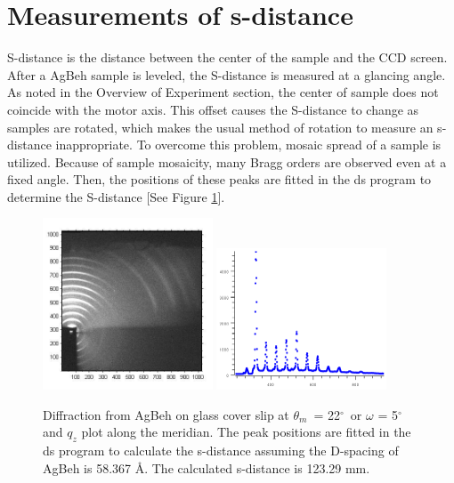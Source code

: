 \documentclass[letterpaper,12pt]{article}
\newcommand{\dg}{$^{\circ}$}%
\newcommand{\motor}{$\theta_m$}%
\begin{document}
\newpage
\section{Measurements of s-distance}
S-distance is the distance between the center of the sample and the CCD screen. After a AgBeh sample is leveled, the S-distance is measured at a glancing angle. As noted in the Overview of Experiment section, the center of sample does not coincide with the motor axis. This offset causes the S-distance to change as samples are rotated, which makes the usual method of rotation to measure an s-distance inappropriate. To overcome this problem, mosaic spread of a sample is utilized. Because of sample mosaicity, many Bragg orders are observed even at a fixed angle. Then, the positions of these peaks are fitted in the ds program to determine the S-distance [See Figure \ref{fig:AgBeh22deg}]. 
\begin{figure}[htbp]
	\centering
	\includegraphics[width=0.45\textwidth]{AgBeh_22}
	\includegraphics[width=0.45\textwidth]{AgBeh_sdist_22}
	\caption[Diffraction from AgBeh on glass cover slip at \motor\ = 22\dg\ or $\omega$ = 5\dg and $q_z$ plot along the meridian]{Diffraction from AgBeh on glass cover slip at \motor\ = 22\dg\ or $\omega$ = 5\dg and $q_z$ plot along the meridian. The peak positions are fitted in the ds program to calculate the s-distance assuming the D-spacing of AgBeh is 58.367 \AA. The calculated s-distance is 123.29 mm.}
	\label{fig:AgBeh22deg}
\end{figure}
\end{document}
